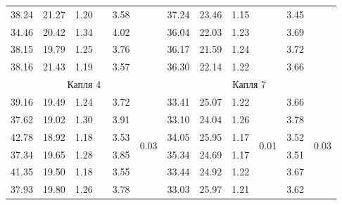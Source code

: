 \documentclass[14pt, a4paper,reqno]{article}
\begin{document}
\begin{table}[h]
\begin{tabular}{|c|c|c|c|c|c|c|c|c|c|c|c|}
        38.24   & 21.27   & 1.20    &                       & 3.58 &                       & 37.24   & 23.46   & 1.15    &                       & 3.45 &                       \\ \hhline{---~-~---~-~}
        34.46   & 20.42   & 1.34    &                       & 4.02 &                       & 36.04   & 22.03   & 1.23    &                       & 3.69 &                       \\ \hhline{---~-~---~-~}
        38.15   & 19.79   & 1.25    &                       & 3.76 &                       & 36.17   & 21.59   & 1.24    &                       & 3.72 &                       \\ \hhline{---~-~---~-~}
        38.16   & 21.43   & 1.19    &                       & 3.57 &                       & 36.30   & 22.14   & 1.22    &                       & 3.66 &                       \\ \hline       
        \multicolumn{6}{|c|}{Капля 4}                                                       & \multicolumn{6}{|c|}{Капля 7}                                                      \\ \hline       
        39.16   & 19.49   & 1.24    &    & 3.72 & \multirow{6}{*}{0.03} & 33.41   & 25.07   & 1.22    & \multirow{6}{*}{0.01} & 3.66 & \multirow{6}{*}{0.03} \\ \hhline{---~-~---~-~}
        37.62   & 19.02   & 1.30    &                       & 3.91 &                       & 33.10   & 24.04   & 1.26    &                       & 3.78 &                       \\ \hhline{---~-~---~-~}
        42.78   & 18.92   & 1.18    &                       & 3.53 &                       & 34.05   & 25.95   & 1.17    &                       & 3.52 &                       \\ \hhline{---~-~---~-~}
        37.34   & 19.65   & 1.28    &                       & 3.85 &                       & 35.34   & 24.69   & 1.17    &                       & 3.51 &                       \\ \hhline{---~-~---~-~}
        41.35   & 19.50   & 1.18    &                       & 3.55 &                       & 33.44   & 24.92   & 1.22    &                       & 3.67 &                       \\ \hhline{---~-~---~-~}
        37.93   & 19.80   & 1.26    &                       & 3.78 &                       & 33.03   & 25.97   & 1.21    &                       & 3.62 &                       \\ \hline       
        
        \end{tabular}
    \end{table}
\end{document}
